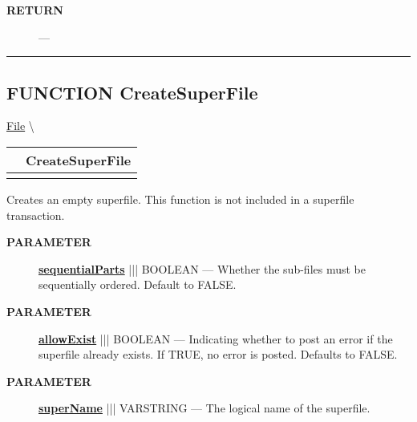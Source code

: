 \par
\begin{description}
\item [\colorbox{tagtype}{\color{white} \textbf{\textsf{RETURN}}}] \textbf{} --- 
\end{description}




\rule{\linewidth}{0.5pt}
\subsection*{\textsf{\colorbox{headtoc}{\color{white} FUNCTION}
CreateSuperFile}}

\hypertarget{ecldoc:file.createsuperfile}{}
\hspace{0pt} \hyperlink{ecldoc:File}{File} \textbackslash 

{\renewcommand{\arraystretch}{1.5}
\begin{tabularx}{\textwidth}{|>{\raggedright\arraybackslash}l|X|}
\hline
\hspace{0pt}\mytexttt{\color{red} } & \textbf{CreateSuperFile} \\
\hline
\multicolumn{2}{|>{\raggedright\arraybackslash}X|}{\hspace{0pt}\mytexttt{\color{param} (varstring superName, boolean sequentialParts=FALSE, boolean allowExist=FALSE)}} \\
\hline
\end{tabularx}
}

\par





Creates an empty superfile. This function is not included in a superfile transaction.






\par
\begin{description}
\item [\colorbox{tagtype}{\color{white} \textbf{\textsf{PARAMETER}}}] \textbf{\underline{sequentialParts}} ||| BOOLEAN --- Whether the sub-files must be sequentially ordered. Default to FALSE.
\item [\colorbox{tagtype}{\color{white} \textbf{\textsf{PARAMETER}}}] \textbf{\underline{allowExist}} ||| BOOLEAN --- Indicating whether to post an error if the superfile already exists. If TRUE, no error is posted. Defaults to FALSE.
\item [\colorbox{tagtype}{\color{white} \textbf{\textsf{PARAMETER}}}] \textbf{\underline{superName}} ||| VARSTRING --- The logical name of the superfile.
\end{description}








